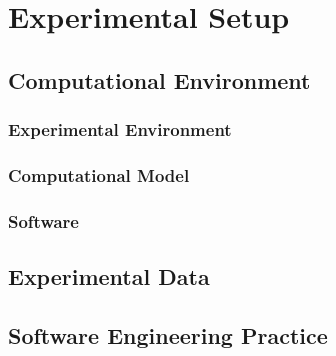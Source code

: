 %
%
%
%   
%
%
\chapter{Experimental Setup} \label{chap:experimentalsetup}


\section{Computational Environment}

\subsection{Experimental Environment}

\subsection{Computational Model}

\subsection{Software}

\section{Experimental Data}

\section{Software Engineering Practice}
